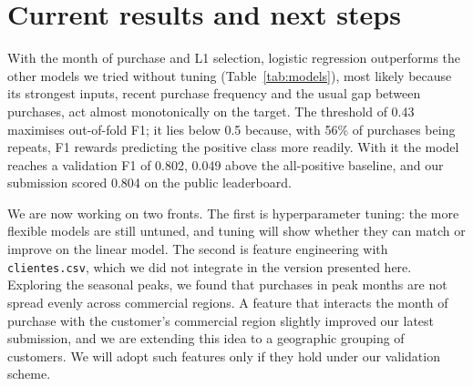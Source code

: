 \documentclass[10pt,a4paper]{article}
\begin{document}
\section{Current results and next steps}

With the month of purchase and L1 selection, logistic regression outperforms the other models we tried without tuning (Table~\ref{tab:models}), most likely because its strongest inputs, recent purchase frequency and the usual gap between purchases, act almost monotonically on the target. The threshold of 0.43 maximises out-of-fold F1; it lies below 0.5 because, with 56\% of purchases being repeats, F1 rewards predicting the positive class more readily. With it the model reaches a validation F1 of 0.802, 0.049 above the all-positive baseline, and our submission scored 0.804 on the public leaderboard.

We are now working on two fronts. The first is hyperparameter tuning: the more flexible models are still untuned, and tuning will show whether they can match or improve on the linear model. The second is feature engineering with \texttt{clientes.csv}, which we did not integrate in the version presented here. Exploring the seasonal peaks, we found that purchases in peak months are not spread evenly across commercial regions. A feature that interacts the month of purchase with the customer's commercial region slightly improved our latest submission, and we are extending this idea to a geographic grouping of customers. We will adopt such features only if they hold under our validation scheme.
\end{document}
